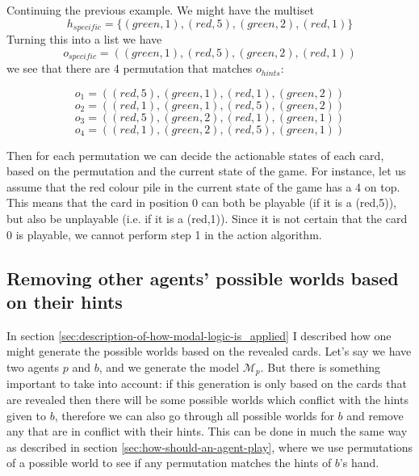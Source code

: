 Continuing the previous example.
We might have the multiset \[h_{specific} = \{(green,1),(red,5),(green,2),(red,1)\}\]
Turning this into a list we have
\[o_{specific} = ((green,1),(red,5),(green,2),(red,1))\]
we see that there are 4 permutation that matches $o_{hints}$:

\[o_{1} = ((red,5),(green,1),(red,1),(green,2))\]
\[o_{2} = ((red,1),(green,1),(red,5),(green,2))\]
\[o_{3} = ((red,5),(green,2),(red,1),(green,1))\]
\[o_{4} = ((red,1),(green,2),(red,5),(green,1))\]

Then for each permutation we can decide the actionable states of each card, based on the permutation and the current state of the game.
For instance, let us assume that the red colour pile in the current state of the game has a 4 on top.
This means that the card in position 0 can both be playable (if it is a (red,5)), but also be unplayable (i.e. if it is a (red,1)).
Since it is not certain that the card 0 is playable, we cannot perform step 1 in the action algorithm.


\subsection{Removing other agents' possible worlds based on their hints} \label{sec:design:removing-worlds-based-on-hints}
In section \ref{sec:description-of-how-modal-logic-is_applied} I described how one might generate the possible worlds based on the revealed cards.
Let's say we have two agents $p$ and $b$, and we generate the model $\mathcal{M}_p$.
But there is something important to take into account: if this generation is only based on the cards that are revealed then there will be some possible worlds which conflict with the hints given to $b$, therefore we can also go through all possible worlds for $b$ and remove any that are in conflict with their hints.
This can be done in much the same way as described in section \ref{sec:how-should-an-agent-play}, where we use permutations of a possible world to see if any permutation matches the hints of $b$'s hand.

